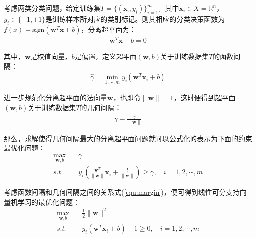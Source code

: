 考虑两类分类问题，给定训练集$T=\{(\mathbf{x}_i,y_i)\}^m_{i=1}$，其中$\mathbf{x}_i\in X=\mathbf{\mathbb{R}}^n$，$y_i \in \{-1,+1\}$是训练样本所对应的类别标记。则其相应的分类决策函数为$f(x)=\mathrm{sign}(\mathbf{w}^T\mathbf{x}+b)$，分离超平面为：
\begin{align} %
   \mathbf{w}^T\mathbf{x}+b=0
\end{align}

其中，$\mathbf{w}$是权值向量，$b$是偏置。定义超平面$(\mathbf{w},b)$关于训练数据集$T$的函数间隔：
\begin{align} %
   \hat{\gamma}=\min_{1,\cdots,m}y_i(\mathbf{w}^T\mathbf{x}_i+b)
\end{align}

进一步规范化分离超平面的法向量$\mathbf{w}$，也即令$\|\mathbf{w}\|=1$，这时便得到超平面$(\mathbf{w},b)$关于训练数据集$T$的几何间隔：
\begin{align} %
   \gamma=\frac{\hat{\gamma}}{\|\mathbf{w}\|}
   \label{equ:margin} 
\end{align}

那么，求解使得几何间隔最大的分离超平面问题就可以公式化的表示为下面的约束最优化问题：
\begin{equation}
\begin{split} %
   \max_{\mathbf{w},b} \quad & \gamma \\
   s.t. \quad & y_i \left( \frac{\mathbf{w}^T}{\|\mathbf{w}\|}\mathbf{x}_i+\frac{b}{\|\mathbf{w}\|} \right) \ge \gamma, \quad i=1,2,\cdots,m
\end{split}
\end{equation}

考虑函数间隔和几何间隔之间的关系式(\ref{equ:margin})，便可得到线性可分支持向量机学习的最优化问题：
\begin{equation}
\begin{split} %
   \max_{\mathbf{w},b} \quad & \frac{1}{2}\|\mathbf{w}\|^2 \\
   s.t. \quad & y_i(\mathbf{w}^T\mathbf{x}_i+b)-1 \ge 0, \quad i=1,2,\cdots,m
\end{split}
\end{equation}

